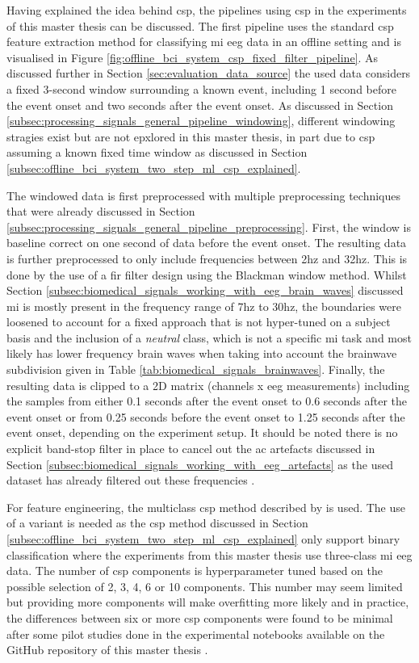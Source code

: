 Having explained the idea behind \gls{csp}, the pipelines using \gls{csp} in the experiments of this master thesis can be discussed.
The first pipeline uses the standard \gls{csp} feature extraction method for classifying \gls{mi} \gls{eeg} data in an offline setting and is visualised in Figure \ref{fig:offline_bci_system_csp_fixed_filter_pipeline}.
As discussed further in Section \ref{sec:evaluation_data_source} the used data considers a fixed 3-second window surrounding a known event, including 1 second before the event onset and two seconds after the event onset.
As discussed in Section \ref{subsec:processing_signals_general_pipeline_windowing}, different windowing stragies exist but are not epxlored in this master thesis, in part due to \gls{csp} assuming a known fixed time window as discussed in Section \ref{subsec:offline_bci_system_two_step_ml_csp_explained}.

The windowed data is first preprocessed with multiple preprocessing techniques that were already discussed in Section \ref{subsec:processing_signals_general_pipeline_preprocessing}.
First, the window is baseline correct on one second of data before the event onset.
The resulting data is further preprocessed to only include frequencies between 2\gls{hz} and 32\gls{hz}.
This is done by the use of a \gls{fir} filter design using the Blackman window method.
Whilst Section \ref{subsec:biomedical_signals_working_with_eeg_brain_waves} discussed \gls{mi} is mostly present in the frequency range of 7\gls{hz} to 30\gls{hz}, the boundaries were loosened to account for a fixed approach that is not hyper-tuned on a subject basis and the inclusion of a \textit{neutral} class, which is not a specific \gls{mi} task and most likely has lower frequency brain waves when taking into account the brainwave subdivision given in Table \ref{tab:biomedical_signals_brainwaves}.
Finally, the resulting data is clipped to a 2D matrix (channels x \gls{eeg} measurements) including the samples from either 0.1 seconds after the event onset to 0.6 seconds after the event onset or from 0.25 seconds before the event onset to 1.25 seconds after the event onset, depending on the experiment setup.
It should be noted there is no explicit band-stop filter in place to cancel out the \gls{ac} artefacts discussed in Section \ref{subsec:biomedical_signals_working_with_eeg_artefacts} as the used dataset has already filtered out these frequencies \citep{eeg_data}.

For feature engineering, the multiclass \gls{csp} method described by \citet{used_mc_csp} is used.
The use of a variant is needed as the \gls{csp} method discussed in Section \ref{subsec:offline_bci_system_two_step_ml_csp_explained} only support binary classification where the experiments from this master thesis use three-class \gls{mi} \gls{eeg} data.
The number of \gls{csp} components is hyperparameter tuned based on the possible selection of 2, 3, 4, 6 or 10 components.
This number may seem limited but providing more components will make overfitting more likely and in practice, the differences between six or more \gls{csp} components were found to be minimal after some pilot studies done in the experimental notebooks available on the GitHub repository of this master thesis \citep{github_project}.

